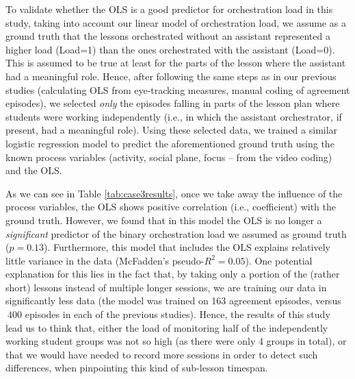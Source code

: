 \documentclass[10pt,journal,compsoc]{IEEEtran}
\begin{document}
To validate whether the OLS is a good predictor for orchestration load in this study, taking into account our linear model of orchestration load, we assume as a ground truth that the lessons orchestrated without an assistant represented a higher load (Load=1) than the ones orchestrated with the assistant (Load=0). This is assumed to be true at least for the parts of the lesson where the assistant had a meaningful role. Hence, after following the same steps as in our previous studies (calculating OLS from eye-tracking measures, manual coding of agreement episodes), we selected \textit{only} the episodes falling in parts of the lesson plan where students were working independently (i.e., in which the assistant orchestrator, if present, had a meaningful role). Using these selected data, we trained a similar logistic regression model to predict the aforementioned ground truth using the known process variables (activity, social plane, focus -- from the video coding) and the OLS.

As we can see in Table \ref{tab:case3results}, once we take away the influence of the process variables, the OLS shows positive correlation (i.e., coefficient) with the ground truth. However, we found that in this model the OLS is no longer a \textit{significant} predictor of the binary orchestration load we assumed as ground truth ($p=0.13$). Furthermore, this model that includes the OLS explains relatively little variance in the data (McFadden's pseudo-$R^2=0.05$). One potential explanation for this lies in the fact that, by taking only a portion of the (rather short) lessons instead of multiple longer sessions, we are training our data in significantly less data (the model was trained on 163 agreement episodes, versus $~400$ episodes in each of the previous studies). Hence, the results of this study lead us to think that, either the load of monitoring half of the independently working student groups was not so high (as there were only 4 groups in total), or that we would have needed to record more sessions in order to detect such differences, when pinpointing this kind of sub-lesson timespan.
\end{document}
